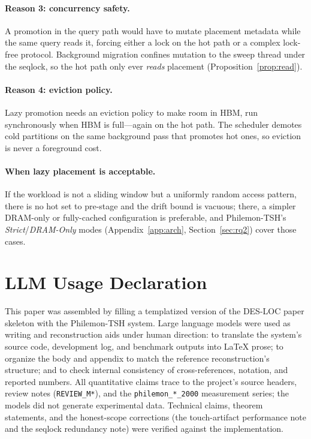 \documentclass[10pt]{article}
\theoremstyle{definition}
\begin{document}
\paragraph{Reason 3: concurrency safety.}
A promotion in the query path would have to mutate placement metadata while the same query reads it, forcing
either a lock on the hot path or a complex lock-free protocol. Background migration confines mutation to the
sweep thread under the seqlock, so the hot path only ever \emph{reads} placement (Proposition~\ref{prop:read}).

\paragraph{Reason 4: eviction policy.}
Lazy promotion needs an eviction policy to make room in HBM, run synchronously when HBM is full---again on the
hot path. The scheduler demotes cold partitions on the same background pass that promotes hot ones, so eviction
is never a foreground cost.

\paragraph{When lazy placement is acceptable.}
If the workload is not a sliding window but a uniformly random access pattern, there is no hot set to
pre-stage and the drift bound is vacuous; there, a simpler DRAM-only or fully-cached configuration is
preferable, and Philemon-TSH's \emph{Strict}/\emph{DRAM-Only} modes (Appendix~\ref{app:arch},
Section~\ref{sec:rq2}) cover those cases.

\section{LLM Usage Declaration}
\label{app:llm}

This paper was assembled by filling a templatized version of the DES-LOC paper skeleton with the Philemon-TSH
system. Large language models were used as writing and reconstruction aids under human direction: to translate
the system's source code, development log, and benchmark outputs into LaTeX prose; to organize the body and
appendix to match the reference reconstruction's structure; and to check internal consistency of cross-references,
notation, and reported numbers. All quantitative claims trace to the project's source headers, review notes
(\texttt{REVIEW\_M*}), and the \texttt{philemon\_*\_2000} measurement series; the models did not generate
experimental data. Technical claims, theorem statements, and the honest-scope corrections (the touch-artifact
performance note and the seqlock redundancy note) were verified against the implementation.
\end{document}
